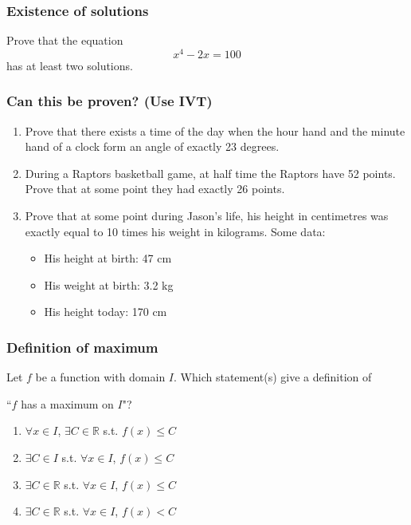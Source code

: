 \documentclass[14pt]{beamer}
\newcommand {\DS} [1] {${\displaystyle #1}$}
\newcommand {\R}{\mathbb{R}}
\newcommand{\setsize}[1]{\fontsize{#1}{#1}\selectfont} %
\newcommand{\smallerfont}{\setsize{13}} %
\begin{document}
\begin{frame}
\frametitle{Existence of solutions}

Prove that the equation 
	$$
		x^4 - 2x = 100
	$$
has at least two solutions.

\end{frame}
\begin{frame}[t]
\frametitle{Can this be proven? (Use IVT)}
\smallerfont
\begin{enumerate}
\item  Prove that there exists a time of the day when the hour hand and the minute hand of a clock form an angle of exactly 23 degrees.

\vfill
\item  During a Raptors basketball game, at half time the Raptors have 52 points.  Prove that at some point they had exactly 26 points.

 \vfill
\item  Prove that at some point during Jason's life, his height in centimetres was exactly equal to 10 times his weight in kilograms.  Some data:
	\begin{itemize}
		\item  His height at birth: 47 cm
		\item  His weight at birth: 3.2 kg
		\item  His height today: 170 cm
	\end{itemize}
\vfill
\end{enumerate}

\end{frame}


\begin{frame}
\frametitle{Definition of maximum}

Let $f$ be a function with domain $I$.  
	Which statement(s) give a definition of

	\bigskip
	``$f$ has a maximum on $I$"?

	\bigskip
\begin{enumerate}
	\item   \DS{\forall x \in I}, \DS{\exists C \in \R} s.t. \DS{f(x) \leq C}
	\item  \DS{\exists C \in I} s.t. \DS{\forall x \in I}, \DS{f(x) \leq C}
	\item  \DS{\exists C \in \R} s.t. \DS{\forall x \in I}, \DS{f(x) \leq C}
	\item  \DS{\exists C \in \R} s.t. \DS{\forall x \in I}, \DS{f(x) < C}
\end{enumerate}

\end{frame}
\end{document}
